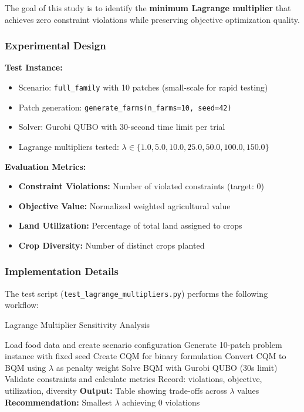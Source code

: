 \documentclass{article}
\begin{document}
The goal of this study is to identify the \textbf{minimum Lagrange multiplier} that achieves zero constraint violations while preserving objective optimization quality.

\subsubsection{Experimental Design}

\textbf{Test Instance:}
\begin{itemize}
    \item Scenario: \texttt{full\_family} with 10 patches (small-scale for rapid testing)
    \item Patch generation: \texttt{generate\_farms(n\_farms=10, seed=42)}
    \item Solver: Gurobi QUBO with 30-second time limit per trial
    \item Lagrange multipliers tested: $\lambda \in \{1.0, 5.0, 10.0, 25.0, 50.0, 100.0, 150.0\}$
\end{itemize}

\textbf{Evaluation Metrics:}
\begin{itemize}
    \item \textbf{Constraint Violations:} Number of violated constraints (target: 0)
    \item \textbf{Objective Value:} Normalized weighted agricultural value
    \item \textbf{Land Utilization:} Percentage of total land assigned to crops
    \item \textbf{Crop Diversity:} Number of distinct crops planted
\end{itemize}

\subsubsection{Implementation Details}

The test script (\texttt{test\_lagrange\_multipliers.py}) performs the following workflow:

\begin{algorithm}[H]
\caption{Lagrange Multiplier Sensitivity Analysis}
\begin{algorithmic}[1]
\State Load food data and create scenario configuration
\State Generate 10-patch problem instance with fixed seed
\State Create CQM for binary formulation
    \State Convert CQM to BQM using $\lambda$ as penalty weight
    \State Solve BQM with Gurobi QUBO (30s limit)
    \State Validate constraints and calculate metrics
    \State Record: violations, objective, utilization, diversity
\EndFor
\State \textbf{Output:} Table showing trade-offs across $\lambda$ values
\State \textbf{Recommendation:} Smallest $\lambda$ achieving 0 violations
\end{algorithmic}
\end{algorithm}
\end{document}

